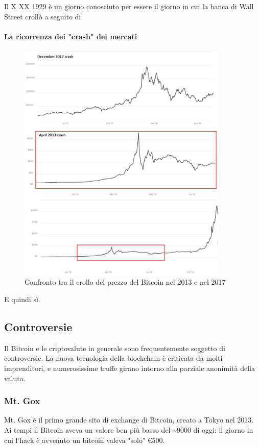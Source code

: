 \documentclass {article}
\begin{document}
{Il X XX 1929 è un giorno conosciuto per essere il giorno in cui la banca di Wall Street crollò a seguito di


\paragraph {La ricorrenza dei "crash" dei mercati}


\vspace {0.5cm}
\begin {figure}[h]
\includegraphics [width = 10cm] {media/crash2.png}
\caption {Confronto tra il crollo del prezzo del Bitcoin nel 2013 e nel 2017}
\end {figure}
\vspace {0.5cm}

E quindi sì.


\subsection {Controversie}


Il Bitcoin e le criptovalute in generale sono frequentemente soggetto di controversie. La nuova tecnologia della blockchain è criticata da molti imprenditori, e numerosissime truffe girano intorno alla parziale anonimità della valuta.


\subsubsection {Mt. Gox}


Mt. Gox è il primo grande sito di exchange di Bitcoin, creato a Tokyo nel 2013.
Ai tempi il Bitcoin aveva un valore ben più basso del \textasciitilde 9000 di oggi: il giorno in cui l'hack è avvenuto un bitcoin valeva "solo" \euro{500}.


}
\end{document}
